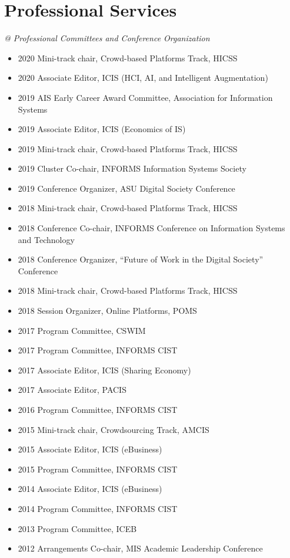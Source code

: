 \documentclass[paper=letter,fontsize=10pt]{scrartcl} %
\newcommand{\NewPart}[2]{\section*{{#1} #2}}
\begin{document}

\NewPart{Professional Services}{}
\noindent\textit{@ Professional Committees and Conference Organization}
\begin{itemize}
\item 2020 Mini-track chair, Crowd-based Platforms Track, HICSS
\item 2020 Associate Editor, ICIS (HCI, AI, and Intelligent Augmentation)
\item 2019 AIS Early Career Award Committee, Association for Information Systems
\item 2019 Associate Editor, ICIS (Economics of IS)
\item 2019 Mini-track chair, Crowd-based Platforms Track, HICSS
\item 2019 Cluster Co-chair, INFORMS Information Systems Society
\item 2019 Conference Organizer, ASU Digital Society Conference
\item 2018 Mini-track chair, Crowd-based Platforms Track, HICSS
\item 2018 Conference Co-chair, INFORMS Conference on Information Systems and Technology
\item 2018 Conference Organizer, ``Future of Work in the Digital Society'' Conference
\item 2018 Mini-track chair, Crowd-based Platforms Track, HICSS
\item 2018 Session Organizer, Online Platforms, POMS
\item 2017 Program Committee, CSWIM
\item 2017 Program Committee, INFORMS CIST
\item 2017 Associate Editor, ICIS (Sharing Economy)
\item 2017 Associate Editor, PACIS
\item 2016 Program Committee, INFORMS CIST
\item 2015 Mini-track chair, Crowdsourcing Track, AMCIS
\item 2015 Associate Editor, ICIS (eBusiness)
\item 2015 Program Committee, INFORMS CIST
\item 2014 Associate Editor, ICIS (eBusiness)
\item 2014 Program Committee, INFORMS CIST
\item 2013 Program Committee, ICEB
\item 2012 Arrangements Co-chair, MIS Academic Leadership Conference
\end{itemize}
\end{document}
